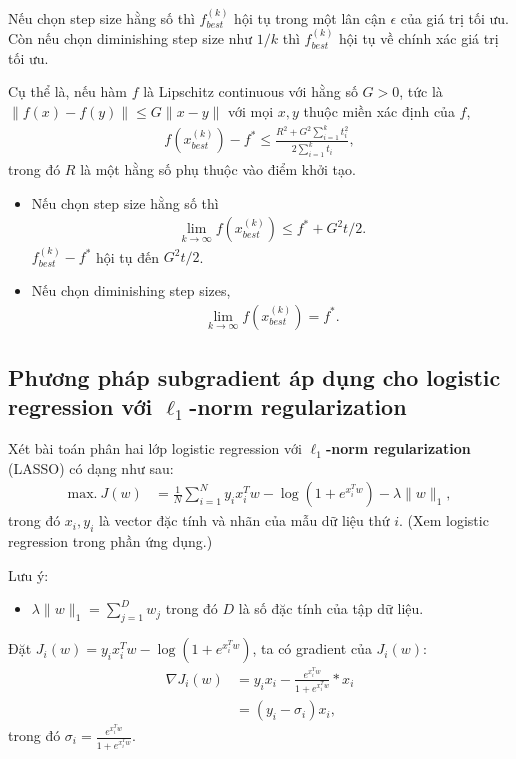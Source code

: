 \documentclass{book}
\begin{document}
Nếu chọn step size hằng số thì $f_{best}^{(k)}$ hội tụ trong một lân cận $\epsilon$ của giá trị tối ưu.
Còn nếu chọn diminishing step size như $1/k$ thì $f_{best}^{(k)}$ hội tụ về chính xác giá trị tối ưu.

Cụ thể là, nếu hàm $f$ là Lipschitz continuous với hằng số $G >0$, tức là $\|f(x)-f(y)\| \leq G \|x-y\|$ với mọi $x,y$ thuộc miền xác định của $f$,
\begin{align*}
f(x_{best}^{(k)}) - f^* \leq \frac{R^2 + G^2 \sum_{i=1}^k t_i^2}{2\sum_{i=1}^k t_i}, 
\end{align*}
trong đó $R$ là một hằng số phụ thuộc vào điểm khởi tạo.
\begin{itemize}
\item Nếu chọn step size hằng số thì 
\begin{align*}
\lim_{k \rightarrow \infty} f(x_{best}^{(k)}) \leq f^* + G^2 t/2.
\end{align*}
$f_{best}^{(k)} - f^*$ hội tụ đến $G^2 t/2$.
\item Nếu chọn diminishing step sizes, 
\begin{align*}
\lim_{k \rightarrow \infty} f(x_{best}^{(k)}) = f^*.
\end{align*}
\end{itemize}


\subsection{Phương pháp subgradient áp dụng cho logistic regression với \textbf{$\ell_1$-norm regularization}}
Xét bài toán phân hai lớp logistic regression với \textbf{$\ell_1$-norm regularization} (LASSO) có dạng như sau:
\begin{align*}
\mathrm{max.~} J(w) &= \frac{1}{N}\sum_{i=1}^N y_i x_i^T w - \log (1 + e^{ x_i^T w}) - \lambda \|w\|_1,
\end{align*}
trong đó $x_i, y_i$ là vector đặc tính và nhãn của mẫu dữ liệu thứ $i$. 
(Xem logistic regression trong phần ứng dụng.)

Lưu ý:
\begin{itemize}
\item $\lambda \|w\|_1 = \sum_{j=1}^D w_j$ trong đó $D$ là số đặc tính của tập dữ liệu.
\end{itemize}

Đặt $J_i(w) = y_i x_i^T w - \log (1 + e^{ x_i^T w})$, ta có gradient của $J_i(w)$:
\begin{align*}
\nabla J_i(w) & = y_i x_i - \frac{e^{x_i^T w}}{1 + e^{x_i^T w}} * x_i \\
		& = (y_i - \sigma_i)x_i,
\end{align*}
trong đó  $\sigma_i = \frac{e^{x_i^T w}}{1 + e^{x_i^T w}}$.
\end{document}
